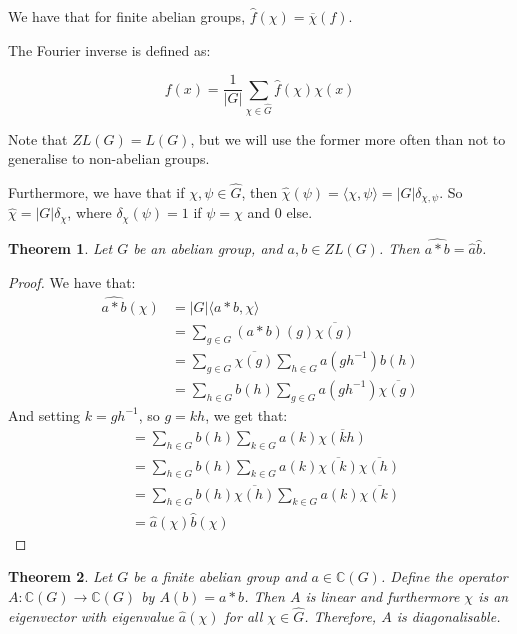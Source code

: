\documentclass[]{article}
\newtheorem{theorem}{Theorem}
\theoremstyle{definition}
\numberwithin{theorem}{section}
\numberwithin{equation}{section}
\begin{document}
We have that for finite abelian groups, $\widehat{f}(\chi) = \overline{\chi}(f)$. 

The Fourier inverse is defined as:

\begin{equation}
	f(x) = \frac{1}{|G|} \sum_{\chi \in \widehat{G}} \widehat{f}(\chi) \chi(x)
\end{equation}

Note that $ZL(G) = L(G)$, but we will use the former more often than not to generalise to non-abelian groups.

Furthermore, we have that if $\chi, \psi \in \widehat{G}$, then $\widehat{\chi}(\psi) = \langle \chi, \psi \rangle = |G|\delta_{\chi, \psi}$. So $\widehat{\chi} = |G| \delta_{\chi}$, where $\delta_{\chi}(\psi) = 1$ if $\psi = \chi$ and 0 else. 

\begin{theorem}
	\label{thm:abelian dual commutation}
	Let $G$ be an abelian group, and $a, b \in ZL(G)$. Then $ \widehat{a \ast b} = \widehat{a} \widehat{b}$. 
\end{theorem}

\begin{proof}
	We have that:
\begin{align*}
		\widehat{a \ast b}(\chi) &= |G| \langle a \ast b, \chi \rangle\\
		&= \sum_{g \in G} (a \ast b) (g) \overline{\chi(g)} \\
		&= \sum_{g \in G} \overline{\chi(g)} 
		\sum_{h \in G} a(g h^{-1}) b(h) \\
		&= \sum_{h \in G} b(h)  
		\sum_{g \in G} a(g h^{-1})\overline{\chi(g)}  
\end{align*} 
And setting $k = gh^{-1}$, so $g =kh$, we get that:
\begin{align*}
		&= \sum_{h \in G} b(h)  
		\sum_{k \in G} a(k)\overline{\chi(kh)} \\
		&= \sum_{h \in G} b(h)  
		\sum_{k \in G} a(k)\overline{\chi(k)} \overline{\chi(h)} \\
		&=  \sum_{h \in G} b(h)  \overline{\chi(h)} 
		\sum_{k \in G} a(k)\overline{\chi(k)}\\
		&= \widehat{a}(\chi) \widehat{b}(\chi)
\end{align*}
\end{proof}

\begin{theorem}
	\label{thm:Eigenvector operators}
	Let $G$ be a finite abelian group and $a \in \mathbb{C}(G)$. Define the operator $A: \mathbb{C}(G) \rightarrow \mathbb{C}(G)$ by $A(b) = a \ast b$. Then $A$ is linear and furthermore $\chi$ is an eigenvector with eigenvalue $\widehat{a}(\chi)$ for all $\chi \in \widehat{G}$. Therefore, $A$ is diagonalisable. 
\end{theorem}
\end{document}
